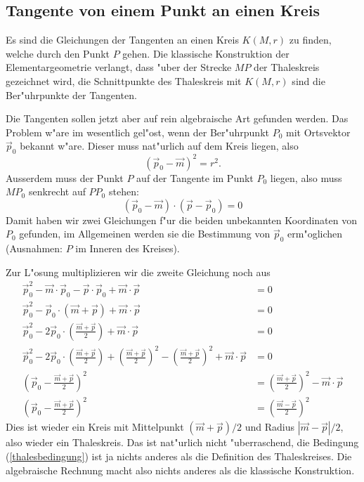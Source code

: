 \subsection{Tangente von einem Punkt an einen Kreis}
Es sind die Gleichungen der Tangenten an einen Kreis $K(M,r)$ zu finden,
welche durch den Punkt $P$ gehen.
Die klassische Konstruktion der
Elementargeometrie verlangt, dass "uber der Strecke $MP$ der
Thaleskreis gezeichnet wird, die Schnittpunkte des Thaleskreis mit
$K(M,r)$ sind die Ber"uhrpunkte der Tangenten.

Die Tangenten sollen jetzt aber auf rein algebraische Art gefunden
werden.
Das Problem w"are im wesentlich gel"ost, wenn der Ber"uhrpunkt $P_0$
mit Ortsvektor
$\vec p_0$ bekannt w"are.
Dieser muss nat"urlich auf dem Kreis liegen,
also
\[
(\vec p_0-\vec m)^2=r^2.
\]
Ausserdem muss der Punkt $P$ auf der Tangente im Punkt $P_0$ liegen,
also muss $MP_0$ senkrecht auf $PP_0$ stehen:
\begin{equation}
(\vec p_0-\vec m)\cdot(\vec p-\vec p_0)=0
\label{thalesbedingung}
\end{equation}
Damit haben wir zwei Gleichungen f"ur die beiden unbekannten Koordinaten
von $P_0$ gefunden, im Allgemeinen werden sie die Bestimmung von $\vec p_0$
erm"oglichen (Ausnahmen: $P$ im Inneren des Kreises).

Zur L"osung multiplizieren wir die zweite Gleichung noch aus
\begin{align*}
\vec p_0^2-\vec m\cdot\vec p_0-\vec p\cdot\vec p_0+\vec m\cdot\vec p&=0
\\
\vec p_0^2-\vec p_0\cdot (\vec m+\vec p)+\vec m\cdot\vec p&=0
\\
\vec p_0^2-2\vec p_0\cdot \left(\frac{\vec m+\vec p}{2}\right)+\vec m\cdot\vec p&=0
\\
\vec p_0^2-2\vec p_0\cdot \left(\frac{\vec m+\vec p}{2}\right)+
\left(\frac{\vec m+\vec p}2\right)^2
-\left(\frac{\vec m+\vec p}2\right)^2
+\vec m\cdot\vec p&=0
\\
\left(\vec p_0- \frac{\vec m+\vec p}{2}\right)^2
&=
\left(\frac{\vec m+\vec p}2\right)^2
-\vec m\cdot\vec p
\\
\left(\vec p_0- \frac{\vec m+\vec p}{2}\right)^2
&=
\left(\frac{\vec m-\vec p}2\right)^2
\end{align*}
Dies ist wieder ein Kreis mit Mittelpunkt $(\vec m+\vec p)/2$ und
Radius $|\vec m-\vec p|/2$, also wieder ein Thaleskreis.
Das ist nat"urlich nicht "uberraschend, die Bedingung (\ref{thalesbedingung})
ist ja nichts anderes als die Definition des Thaleskreises.
Die algebraische Rechnung macht also nichts anderes als die klassische
Konstruktion.
